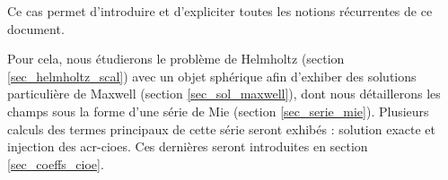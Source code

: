 Ce cas permet d'introduire et d'expliciter toutes les notions récurrentes de ce document.


Pour cela, nous étudierons le problème de Helmholtz (section \ref{sec_helmholtz_scal}) avec un objet sphérique afin d'exhiber des solutions particulière de Maxwell (section \ref{sec_sol_maxwell}), dont nous détaillerons les champs sous la forme d'une série de Mie (section \ref{sec_serie_mie}).
Plusieurs calculs des termes principaux de cette série seront exhibés : solution exacte et injection des \glspl{acr-cioe}.
Ces dernières seront introduites en section  \ref{sec_coeffs_cioe}.



